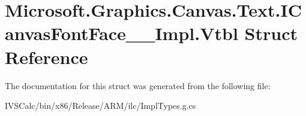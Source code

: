\hypertarget{struct_microsoft_1_1_graphics_1_1_canvas_1_1_text_1_1_i_canvas_font_face_____impl_1_1_vtbl}{}\section{Microsoft.\+Graphics.\+Canvas.\+Text.\+I\+Canvas\+Font\+Face\+\_\+\+\_\+\+Impl.\+Vtbl Struct Reference}
\label{struct_microsoft_1_1_graphics_1_1_canvas_1_1_text_1_1_i_canvas_font_face_____impl_1_1_vtbl}


The documentation for this struct was generated from the following file\+:\begin{DoxyCompactItemize}
\item 
I\+V\+S\+Calc/bin/x86/\+Release/\+A\+R\+M/ilc/Impl\+Types.\+g.\+cs\end{DoxyCompactItemize}
